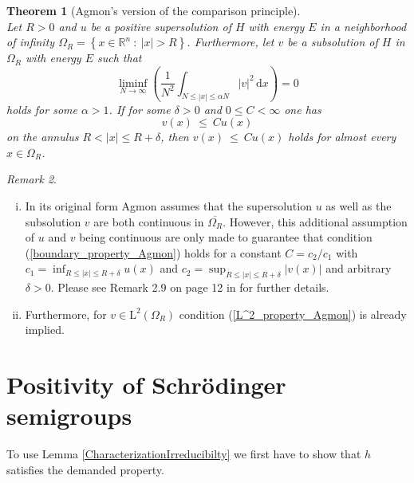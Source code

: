 \documentclass[12pt,longbibliography]{article}
\def\R{\mathbb{R}}
\def\d{\,\mathrm{d}}
\newtheorem{thm}{Theorem}[section]
\theoremstyle{definition}
\theoremstyle{remark}
\newtheorem{rem}[thm]{Remark}
\theoremstyle{example}
\begin{document}
\begin{thm}[Agmon's version of the comparison principle] \label{comparision_principle} \ \\
Let $R > 0$ and $u$ be a positive supersolution of $H$ with energy $E$ in a neighborhood of infinity 
$\Omega_{R} = \left\{ x \in \R^{n} \ : \ |x| > R \right\}$. Furthermore, let $v$ be a subsolution of $H$ in 
$\Omega_{R}$ with energy $E$ such that
\begin{equation}\label{L^2_property_Agmon}
\liminf_{N \to \infty} \left( \frac{1}{N^{2}} \int_{N \leq |x| \leq \alpha N} \left| v \right|^{2} \d x \right) = 0
\end{equation}
holds for some $\alpha > 1$. If for some $\delta > 0$ and $0 \leq C < \infty$ one has
\begin{equation}\label{boundary_property_Agmon}
v(x) \ \leq \ Cu(x) 
\end{equation} 
on the annulus $R < |x| \leq R + \delta$, then $v(x) \ \leq \ Cu(x)$ holds for almost every $x \in \Omega_{R}$.\\
\end{thm}  

\begin{rem} \label{Remark_comparision_principle} \ 
\begin{enumerate}[i.)]
\item In its original form  \cite{Agmon85}
Agmon assumes that the supersolution $u$ as well as the subsolution $v$ are both continuous in $\overline{\Omega_{R}}$. 
However, this additional assumption of $u$ and $v$ being continuous are only made to guarantee that
condition (\ref{boundary_property_Agmon}) holds for a constant $C = c_{2}/c_{1}$ with 
$c_{1} = \inf_{R \leq |x| \leq R+ \delta} u(x)$ and $c_{2} = \sup_{R \leq |x| \leq R+ \delta} \left| v(x) \right|$ and arbitrary $\delta > 0$.
Please see Remark 2.9 on page 12 in \cite{Hundertmark_Jex_Lange_2023} for further details.
\item Furthermore, for $v \in \mathrm{L}^{2}\left( \Omega_{R} \right)$ condition (\ref{L^2_property_Agmon}) is already implied. \\
\end{enumerate}
\end{rem}


\section{Positivity of Schrödinger semigroups}\label{e^{-tH}_positivity_improving}

To use Lemma \ref{CharacterizationIrreducibilty} we first have to show that $h$ satisfies the 
demanded property.\\
\end{document}
